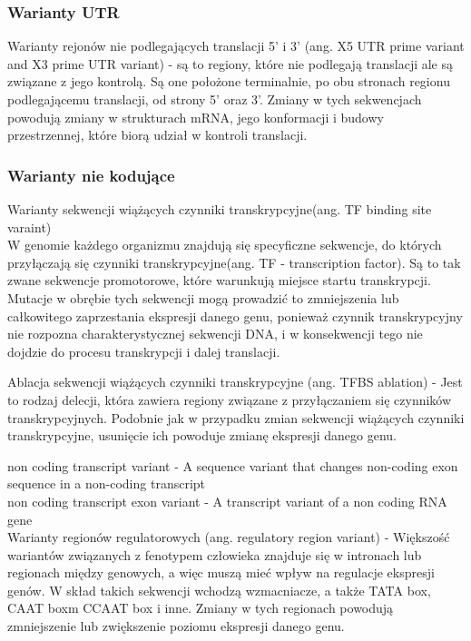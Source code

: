\documentclass[12pt]{article}
\begin{document}
\subsubsection{Warianty UTR}
Warianty rejonów nie podlegających translacji 5' i 3' (ang. X5 UTR prime variant and X3 prime UTR variant) - są to regiony, które nie podlegają translacji ale są związane z jego kontrolą. Są one położone terminalnie, po obu stronach regionu podlegającemu translacji, od strony 5' oraz 3'. Zmiany w tych sekwencjach powodują zmiany w strukturach mRNA, jego konformacji i budowy przestrzennej, które biorą udział w kontroli translacji.

\subsubsection{Warianty nie kodujące}

Warianty sekwencji wiążących czynniki transkrypcyjne(ang. TF binding site varaint) \\
W genomie każdego organizmu znajdują się specyficzne sekwencje, do których przyłączają się czynniki transkrypcyjne(ang. TF - transcription factor). Są to tak zwane sekwencje  promotorowe, które warunkują miejsce startu transkrypcji. Mutacje w obrębie tych sekwencji mogą prowadzić to zmniejszenia lub całkowitego zaprzestania ekspresji danego genu, ponieważ czynnik transkrypcyjny nie rozpozna charakterystycznej sekwencji DNA, i w konsekwencji tego nie dojdzie do procesu transkrypcji i dalej translacji.\indent

Ablacja sekwencji wiążących czynniki transkrypcyjne (ang. TFBS ablation) - Jest to rodzaj delecji, która zawiera regiony związane z przyłączaniem się czynników transkrypcyjnych. Podobnie jak w przypadku zmian sekwencji wiążących czynniki transkrypcyjne, usunięcie ich powoduje zmianę ekspresji danego genu.

non coding transcript variant - A sequence variant that changes non-coding exon sequence in a non-coding transcript	 \\
	
non coding transcript exon variant - A transcript variant of a non coding RNA gene	 \\

Warianty regionów regulatorowych (ang. regulatory region variant)  - Większość wariantów związanych z fenotypem człowieka znajduje się w intronach lub regionach między genowych, a więc muszą mieć wpływ na regulacje ekspresji genów. W skład takich sekwencji wchodzą wzmacniacze, a także TATA box, CAAT boxm CCAAT box i inne. Zmiany w tych regionach powodują zmniejszenie lub zwiększenie poziomu ekspresji danego genu.
\end{document}
